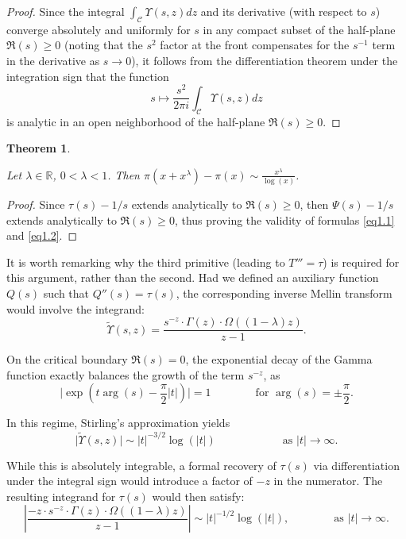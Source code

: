 \documentclass[11pt]{amsart}
\newtheorem{theorem}{Theorem}[section]
\numberwithin{equation}{section}
\newcommand{\R}{\mathbb{R}}
\newcommand{\diint}{\displaystyle \int}
\newcommand{\difrac}{\displaystyle \frac}
\begin{document}
\begin{proof}
Since the integral $\diint_{\mathcal{C}} \Upsilon(s, z) dz$ and its derivative (with respect to $s$) converge absolutely and uniformly for $s$ in any compact subset of the half-plane $\Re(s) \geq 0$ (noting that the $s^2$ factor at the front compensates for the $s^{-1}$ term in the derivative as $s \to 0$), it follows from the differentiation theorem under the integration sign that the function$$s \mapsto \difrac{s^2}{2\pi i} \int_{\mathcal{C}} \Upsilon(s, z) dz $$is analytic in an open neighborhood of the half-plane $\Re(s) \geq 0$. \end{proof}

\begin{theorem} \label{mainresult}

Let $\lambda \in \R$, $0 < \lambda < 1$. Then $\pi(x + x^\lambda) - \pi(x) \sim \difrac{x^\lambda}{\log(x)}$.

\end{theorem}

\begin{proof} Since $\tau(s) - 1/s$ extends analytically to $\Re(s) \geq 0$, then $\Psi(s) - 1/s$ extends analytically to $\Re(s) \geq 0$, thus proving the validity of formulas \ref{eq1.1} and \ref{eq1.2}. \end{proof}

It is worth remarking why the third primitive (leading to $T''' = \tau$) is required for this argument, rather than the second. Had we defined an auxiliary function $Q(s)$ such that $Q''(s) = \tau(s)$, the corresponding inverse Mellin transform would involve the integrand: \begin{equation*} \tilde{\Upsilon}(s, z) = \frac{s^{-z} \cdot \Gamma(z) \cdot \Omega((1 - \lambda)z)}{z - 1}. \end{equation*}

On the critical boundary $\Re(s) = 0$, the exponential decay of the Gamma function exactly balances the growth of the term $s^{-z}$, as $$\bigg|\exp\left(t \arg(s) - \frac{\pi}{2}|t|\right)\bigg| = 1 \qquad \qquad \text{for } \arg(s) = \pm \difrac{\pi}{2}.$$

In this regime, Stirling's approximation yields $$\Big|\tilde{\Upsilon}(s, z)\Big| \sim |t|^{-3/2} \log(|t|) \qquad \qquad \qquad \text{as } |t| \to \infty.$$

While this is absolutely integrable, a formal recovery of $\tau(s)$ via differentiation under the integral sign would introduce a factor of $-z$ in the numerator. The resulting integrand for $\tau(s)$ would then satisfy: \begin{equation*} \left| \frac{-z \cdot s^{-z} \cdot \Gamma(z) \cdot \Omega((1 - \lambda)z)}{z-1} \right| \sim |t|^{-1/2} \log(|t|), \qquad \qquad \text{as } |t| \to \infty. \end{equation*}
\end{document}
